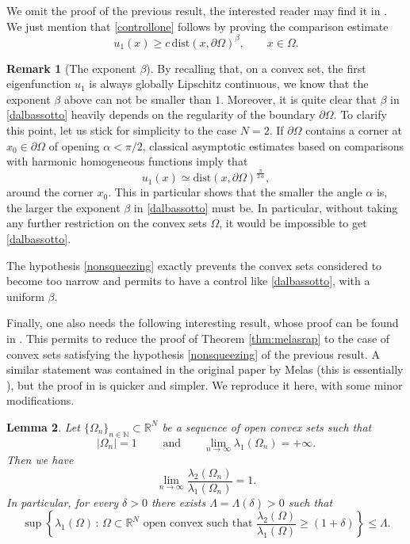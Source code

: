 \documentclass{amsart}
\newtheorem{lemma}{Lemma}[section]
\theoremstyle{definition}
\newtheorem{remark}[lemma]{Remark}
\numberwithin{equation}{section}
\begin{document}
We omit the proof of the previous result, the interested reader may find it in \cite[Lemma 3.5]{MR1168980}.
We just mention that \eqref{controllone} follows by proving the comparison estimate
\begin{equation}
\label{dalbassotto}
u_1(x)\ge c\,\mathrm{dist}(x,\partial\Omega)^\beta,\qquad x\in\Omega.
\end{equation}
\begin{remark}[The exponent $\beta$]
By recalling that, on a convex set, the first eigenfunction $u_1$ is always globally Lipschitz continuous, we know that the exponent $\beta$ above can not be smaller than $1$. Moreover, it is quite clear that $\beta$ in \eqref{dalbassotto} heavily depends on the regularity of the boundary $\partial\Omega$. To clarify this point, let us stick for simplicity to the case $N=2$.  If $\partial\Omega$ contains a corner at $x_0\in\partial\Omega$ of opening $\alpha<\pi/2$, classical asymptotic estimates based on comparisons with harmonic homogeneous functions imply that
\[
u_1(x)\simeq \mathrm{dist}(x,\partial\Omega)^\frac{\pi}{2\,\alpha},
\]
around the corner $x_0$. This in particular shows that the smaller the angle $\alpha$ is, the larger the exponent $\beta$ in \eqref{dalbassotto} must be. In particular, without taking any further restriction on the convex sets $\Omega$, it would be impossible to get \eqref{dalbassotto}.
\par
The hypothesis \eqref{nonsqueezing} exactly prevents the convex sets considered to become too narrow and permits to have a control like \eqref{dalbassotto}, with a uniform $\beta$.
\end{remark}
Finally, one also needs the following interesting result, whose proof can be found in \cite[Section 6.1]{MR2439395}. This permits to reduce the proof of Theorem \ref{thm:melasrap} to the case of convex sets satisfying the hypothesis \eqref{nonsqueezing} of the previous result.
A similar statement was contained in the original paper by Melas (this is essentially \cite[Proposition 3.1]{MR1168980}), but the proof in \cite{MR2439395} is quicker and simpler. We reproduce it here, with some minor modifications.
\begin{lemma}
\label{lm:ABC}
Let $\{\Omega_n\}_{n\in\mathbb{N}}\subset\mathbb{R}^N$ be a sequence of open convex sets such that
\[
|\Omega_n|=1\qquad \mbox{ and}\qquad \lim_{n\to\infty} \lambda_1(\Omega_n)=+\infty.
\]
Then we have 
\begin{equation}
\label{auno}
\lim_{n\to\infty} \frac{\lambda_2(\Omega_n)}{\lambda_1(\Omega_n)}=1.
\end{equation}
In particular, for every $\delta>0$ there exists $\Lambda=\Lambda(\delta)>0$ such that
\begin{equation}
\label{fermi!}
\sup\left\{\lambda_1(\Omega)\, : \, \Omega\subset\mathbb{R}^N \mbox{ open convex such that } \frac{\lambda_2(\Omega)}{\lambda_1(\Omega)}\ge (1+\delta)\right\}\le \Lambda.
\end{equation}
\end{lemma}
\end{document}
